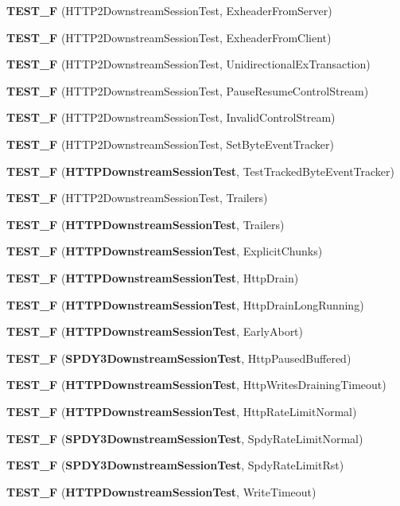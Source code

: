\begin{DoxyCompactItemize}
{\bf T\+E\+S\+T\+\_\+F} (H\+T\+T\+P2\+Downstream\+Session\+Test, Exheader\+From\+Server)
\item 
{\bf T\+E\+S\+T\+\_\+F} (H\+T\+T\+P2\+Downstream\+Session\+Test, Exheader\+From\+Client)
\item 
{\bf T\+E\+S\+T\+\_\+F} (H\+T\+T\+P2\+Downstream\+Session\+Test, Unidirectional\+Ex\+Transaction)
\item 
{\bf T\+E\+S\+T\+\_\+F} (H\+T\+T\+P2\+Downstream\+Session\+Test, Pause\+Resume\+Control\+Stream)
\item 
{\bf T\+E\+S\+T\+\_\+F} (H\+T\+T\+P2\+Downstream\+Session\+Test, Invalid\+Control\+Stream)
\item 
{\bf T\+E\+S\+T\+\_\+F} (H\+T\+T\+P2\+Downstream\+Session\+Test, Set\+Byte\+Event\+Tracker)
\item 
{\bf T\+E\+S\+T\+\_\+F} ({\bf H\+T\+T\+P\+Downstream\+Session\+Test}, Test\+Tracked\+Byte\+Event\+Tracker)
\item 
{\bf T\+E\+S\+T\+\_\+F} (H\+T\+T\+P2\+Downstream\+Session\+Test, Trailers)
\item 
{\bf T\+E\+S\+T\+\_\+F} ({\bf H\+T\+T\+P\+Downstream\+Session\+Test}, Trailers)
\item 
{\bf T\+E\+S\+T\+\_\+F} ({\bf H\+T\+T\+P\+Downstream\+Session\+Test}, Explicit\+Chunks)
\item 
{\bf T\+E\+S\+T\+\_\+F} ({\bf H\+T\+T\+P\+Downstream\+Session\+Test}, Http\+Drain)
\item 
{\bf T\+E\+S\+T\+\_\+F} ({\bf H\+T\+T\+P\+Downstream\+Session\+Test}, Http\+Drain\+Long\+Running)
\item 
{\bf T\+E\+S\+T\+\_\+F} ({\bf H\+T\+T\+P\+Downstream\+Session\+Test}, Early\+Abort)
\item 
{\bf T\+E\+S\+T\+\_\+F} ({\bf S\+P\+D\+Y3\+Downstream\+Session\+Test}, Http\+Paused\+Buffered)
\item 
{\bf T\+E\+S\+T\+\_\+F} ({\bf H\+T\+T\+P\+Downstream\+Session\+Test}, Http\+Writes\+Draining\+Timeout)
\item 
{\bf T\+E\+S\+T\+\_\+F} ({\bf H\+T\+T\+P\+Downstream\+Session\+Test}, Http\+Rate\+Limit\+Normal)
\item 
{\bf T\+E\+S\+T\+\_\+F} ({\bf S\+P\+D\+Y3\+Downstream\+Session\+Test}, Spdy\+Rate\+Limit\+Normal)
\item 
{\bf T\+E\+S\+T\+\_\+F} ({\bf S\+P\+D\+Y3\+Downstream\+Session\+Test}, Spdy\+Rate\+Limit\+Rst)
\item 
{\bf T\+E\+S\+T\+\_\+F} ({\bf H\+T\+T\+P\+Downstream\+Session\+Test}, Write\+Timeout)
\item 

\end{DoxyCompactItemize}
